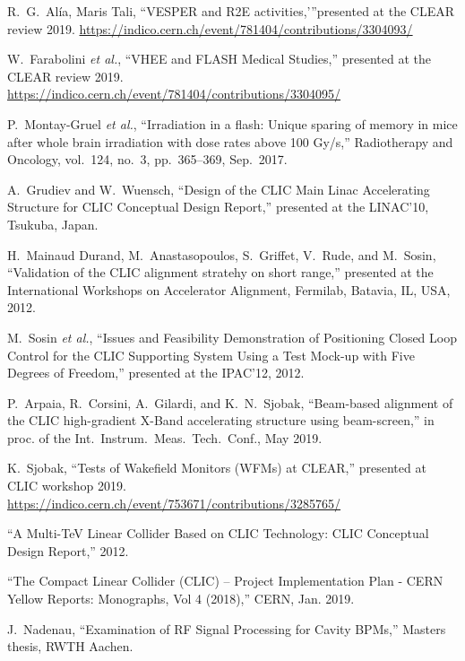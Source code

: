 \documentclass[a4paper,
               keeplastbox,   %
               ]{jacow}
\begin{document}
\begin{thebibliography}{99}
 R.\ G.\ Alía, Maris Tali, “VESPER and R2E activities,'”presented at the CLEAR review 2019. \url{https://indico.cern.ch/event/781404/contributions/3304093/}

 W.\ Farabolini \emph{et al.}, “VHEE and FLASH Medical Studies,” presented at the CLEAR review 2019. \url{https://indico.cern.ch/event/781404/contributions/3304095/}

 P.\ Montay-Gruel \emph{et al.}, “Irradiation in a flash: Unique sparing of memory in mice after whole brain irradiation with dose rates above 100 Gy/s,” Radiotherapy and Oncology, vol.\ 124, no.\ 3, pp.\ 365–369, Sep.\ 2017.

 A.\ Grudiev and W.\ Wuensch, “Design of the CLIC Main Linac Accelerating Structure for CLIC Conceptual Design Report,” presented at the LINAC’10, Tsukuba, Japan.

 H.\ Mainaud Durand, M.\ Anastasopoulos, S.\ Griffet, V.\ Rude, and M.\ Sosin, “Validation of the CLIC alignment stratehy on short range,” presented at the International Workshops on Accelerator Alignment, Fermilab, Batavia, IL, USA, 2012.

 M.\ Sosin \emph{et al.}, “Issues and Feasibility Demonstration of Positioning Closed Loop Control for the CLIC Supporting System Using a Test Mock-up with Five Degrees of Freedom,” presented at the IPAC’12, 2012.

 P.\ Arpaia, R.\ Corsini, A.\ Gilardi, and K.\ N.\ Sjobak, “Beam-based alignment of the CLIC high-gradient X-Band accelerating structure using beam-screen,” in proc. of the Int.\ Instrum.\ Meas.\ Tech.\ Conf., May 2019.

 K.\ Sjobak, “Tests of Wakefield Monitors (WFMs) at CLEAR,” presented at CLIC workshop 2019. \url{https://indico.cern.ch/event/753671/contributions/3285765/}

 “A Multi-TeV Linear Collider Based on CLIC Technology: CLIC Conceptual Design Report,” 2012.

 “The Compact Linear Collider (CLIC) – Project Implementation Plan - CERN Yellow Reports: Monographs, Vol 4 (2018),” CERN, Jan. 2019.

 J.\ Nadenau, “Examination of RF Signal Processing for Cavity BPMs,” Masters thesis, RWTH Aachen.


\end{thebibliography}
\end{document}
